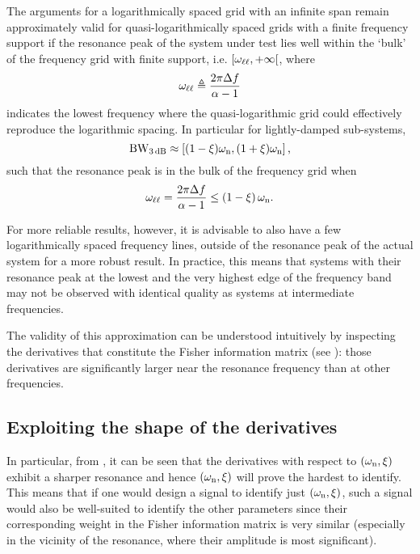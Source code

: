   The arguments for a logarithmically spaced grid with an infinite span remain approximately valid for quasi-logarithmically spaced grids with a finite frequency support if the resonance peak of the system under test lies well within the `bulk' of the frequency grid with finite support, i.e. $\left[ \omega_{\ell \ell}, +\infty \right[$, where
  \begin{equation}
    \omega_{\ell \ell} \triangleq \frac{2\pi \Delta f}{\alpha - 1}
    \label{eq:excitation:linearLogTransitionFrequency}
  \end{equation}
  indicates the lowest frequency where the quasi-logarithmic grid could effectively reproduce the logarithmic spacing.
  In particular for lightly-damped sub-systems, 
  \begin{equation}
  \mathrm{BW}_{3\,\mathrm{dB}} \approx \left[ (1-\xi_{})\omega_{\mathrm{n}}, (1+\xi_{})\omega_{\mathrm{n}} \right]
  \text{,}
  \end{equation}
  such that the resonance peak is in the bulk of the frequency grid when
  \begin{equation} 
    \omega_{\ell \ell} =\frac{2 \pi \Delta f}{\alpha -1} \leq \left( 1 - \xi_{} \right) \omega_{\mathrm{n}}
    \text{.}
    \label{eq:excitation:systemInBulk:generic}
  \end{equation}

  For more reliable results, however, it is advisable to also have a few logarithmically spaced frequency lines, outside of the resonance peak of the actual system for a more robust result.
  In practice, this means that systems with their resonance peak at the lowest and the very highest edge of the frequency band may not be observed with identical quality as systems at intermediate frequencies.

  The validity of this approximation can be understood intuitively by inspecting the derivatives that constitute the Fisher information matrix (see ): those derivatives are significantly larger near the resonance frequency than at other frequencies.

  \subsection{Exploiting the shape of the derivatives}
   In particular, from , it can be seen that the derivatives with respect to $(\omega_{\mathrm{n}}, \xi_{})$ exhibit a sharper resonance and hence $(\omega_{\mathrm{n}}, \xi_{})$ will prove the hardest to identify.
   This means that if one would design a signal to identify just $(\omega_{\mathrm{n}}, \xi_{})$, such a signal would also be well-suited to identify the other parameters since their corresponding weight in the Fisher information matrix is very similar (especially in the vicinity of the resonance, where their amplitude is most significant).

